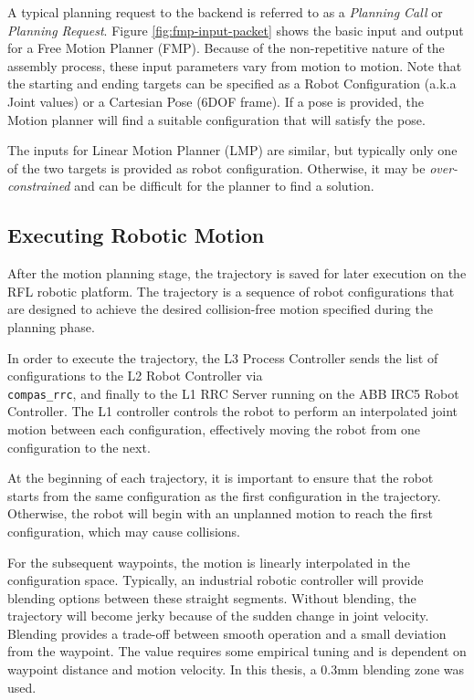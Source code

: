 A typical planning request to the backend is referred to as a \textit{Planning Call} or \textit{Planning Request}. Figure \ref{fig:fmp-input-packet} shows the basic input and output for a Free Motion Planner (FMP). Because of the non-repetitive nature of the assembly process, these input parameters vary from motion to motion. Note that the starting and ending targets can be specified as a Robot Configuration (a.k.a Joint values) or a Cartesian Pose (6DOF frame). If a pose is provided, the Motion planner will find a suitable configuration that will satisfy the pose.

The inputs for Linear Motion Planner (LMP) are similar, but typically only one of the two targets is provided as robot configuration. Otherwise, it may be \textit{over-constrained} and can be difficult for the planner to find a solution.

\FloatBarrier

\subsection{Executing Robotic Motion}
\label{subsection:exploration-2-executing-robotic-motion}

After the motion planning stage, the trajectory is saved for later execution on the RFL robotic platform. The trajectory is a sequence of robot configurations that are designed to achieve the desired collision-free motion specified during the planning phase.

In order to execute the trajectory, the L3 Process Controller  sends the list of configurations to the L2 Robot Controller via\\ \verb|compas_rrc|, and finally to the L1 RRC Server running on the ABB IRC5 Robot Controller. The L1 controller controls the robot to perform an interpolated joint motion  between each configuration, effectively moving the robot from one configuration to the next.

At the beginning of each trajectory, it is important to ensure that the robot starts from the same configuration as the first configuration in the trajectory. Otherwise, the robot will begin with an unplanned motion to reach the first configuration, which may cause collisions.

For the subsequent waypoints, the motion is linearly interpolated in the configuration space. Typically, an industrial robotic controller will provide blending options between these straight segments. Without blending, the trajectory will become jerky because of the sudden change in joint velocity. Blending provides a trade-off between smooth operation and a small deviation from the waypoint. The value requires some empirical tuning and is dependent on waypoint distance and motion velocity. In this thesis, a 0.3mm blending zone was used. 

